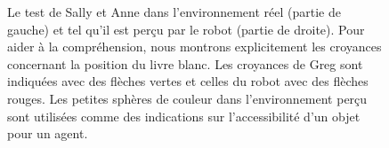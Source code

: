 \documentclass[a4paper,11pt,twoside]{StyleThese}
\begin{document}
\begin{figure}[ht!]
  \begin{center}
 \end{center}
  \caption{Le test de Sally et Anne dans l'environnement réel (partie de gauche) et tel qu'il est perçu par le robot (partie de droite). Pour aider à la compréhension, nous montrons explicitement les croyances concernant la position du livre blanc. Les croyances de Greg sont indiquées avec des flèches vertes et celles du robot avec des flèches rouges.
Les petites sphères de couleur dans l'environnement perçu sont utilisées comme des indications sur l'accessibilité d'un objet pour un agent.}
  \label{SA}
\end{figure}
\end{document}
